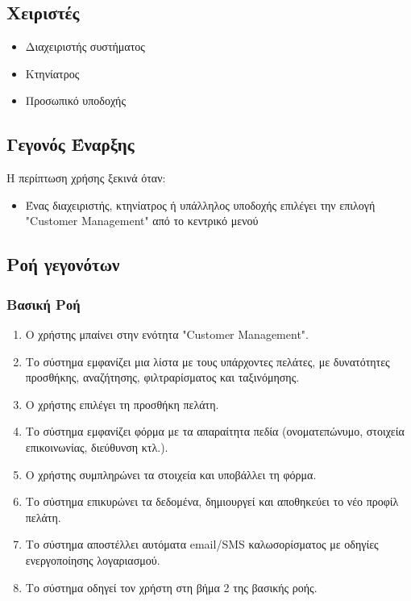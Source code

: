 \documentclass[12pt,a4paper,twoside]{book}
\begin{document}
\subsection{Χειριστές}
\begin{itemize}
  \item Διαχειριστής συστήματος
  \item Κτηνίατρος
  \item Προσωπικό υποδοχής
\end{itemize}

\subsection{Γεγονός Έναρξης}
Η περίπτωση χρήσης ξεκινά όταν:
\begin{itemize}
  \item Ένας διαχειριστής, κτηνίατρος ή υπάλληλος υποδοχής επιλέγει την επιλογή "Customer Management" από το κεντρικό μενού
\end{itemize}

\subsection{Ροή γεγονότων}

\subsubsection{Βασική Ροή}
\begin{enumerate}
  \item Ο χρήστης μπαίνει στην ενότητα "Customer Management".
  \item Το σύστημα εμφανίζει μια λίστα με τους υπάρχοντες πελάτες, με δυνατότητες προσθήκης, αναζήτησης, φιλτραρίσματος και ταξινόμησης.
  \item Ο χρήστης επιλέγει τη προσθήκη πελάτη.
  \item Το σύστημα εμφανίζει φόρμα με τα απαραίτητα πεδία (ονοματεπώνυμο, στοιχεία επικοινωνίας, διεύθυνση κτλ.).
  \item Ο χρήστης συμπληρώνει τα στοιχεία και υποβάλλει τη φόρμα.
  \item Το σύστημα επικυρώνει τα δεδομένα, δημιουργεί και αποθηκεύει το νέο προφίλ πελάτη.
  \item Το σύστημα αποστέλλει αυτόματα email/SMS καλωσορίσματος με οδηγίες ενεργοποίησης λογαριασμού.
  \item Το σύστημα οδηγεί τον χρήστη στη βήμα 2 της βασικής ροής.
\end{enumerate}
\end{document}
